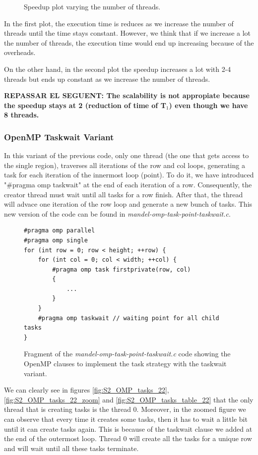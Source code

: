 \documentclass[12pt, a4paper]{article}
\begin{document}
\begin{figure}[H]
\begin{minipage}[b]{0.4\linewidth}
  \caption{Speedup plot varying the number of threads.}
  \label{fig:mandel-omp-10000-strong-21-speedup}
\end{minipage}
\end{figure}

In the first plot, the execution time is reduces as we increase the number of threads until the time stays constant. However, we think that if we increase a lot the number of threads, the execution time would end up increasing because of the overheads.

On the other hand, in the second plot the speedup increases a lot with 2-4 threads but ends up constant as we increase the number of threads.

\textbf{\large{\large{REPASSAR EL SEGUENT: The scalability is not appropiate because the speedup stays at 2 (reduction of time of T$_1$) even though we have 8 threads.}}}

\subsubsection{OpenMP Taskwait Variant}

In this variant of the previous code, only one thread (the one that gets access to the single region), traverses all iterations of the row and col loops, generating a task for each iteration of the innermost loop (point). To do it, we have introduced "\#pragma omp taskwait" at the end of each iteration of a row. Consequently, the creator thread must wait until all tasks for a row finish. After that, the thread will advace one iteration of the row loop and generate a new bunch of tasks. This new version of the code can be found in \textit{mandel-omp-task-point-taskwait.c}.

\begin{figure}[H]
\begin{lstlisting}
#pragma omp parallel
#pragma omp single
for (int row = 0; row < height; ++row) {
	for (int col = 0; col < width; ++col) {
		#pragma omp task firstprivate(row, col)
		{
			...
		}
	}
	#pragma omp taskwait // waiting point for all child tasks
}
\end{lstlisting}
\caption{Fragment of the \textit{mandel-omp-task-point-taskwait.c} code showing the OpenMP clauses to implement the task strategy with the taskwait variant.}
\label{code:task_implementation_point_taskwait}
\end{figure}

We can clearly see in figures \ref{fig:S2_OMP_tasks_22}, \ref{fig:S2_OMP_tasks_22_zoom} and \ref{fig:S2_OMP_tasks_table_22} that the only thread that is creating tasks is the thread 0. Moreover, in the zoomed figure we can observe that every time it creates some tasks, then it has to wait a little bit until it can create tasks again. This is because of the taskwait clause we added at the end of the outermost loop. Thread 0 will create all the tasks for a unique row and will wait until all these tasks terminate.
\end{document}
